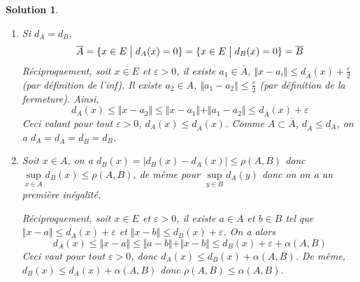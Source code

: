 \documentclass[12pt]{article}
\newtheorem{solution}{Solution}[section]
\theoremstyle{remark}
\begin{document}
\begin{solution}
	\phantom{}
	\begin{enumerate}
		\item Si $d_{A}=d_{B}$, 
		$$\overline{A}=\{x\in E\bigm| d_{A}(x)=0\}=\{x\in E\bigm| d_{B}(x)=0\}=\overline{B}$$
		Réciproquement, soit $x\in E$ et $\varepsilon>0$, il existe $a_{1}\in\overline{A}$, $\Vert x-a_{i}\Vert\leqslant d_{\overline{A}}(x)+\frac{\varepsilon}{2}$ (par définition de l'inf). Il existe $a_{2}\in A$, $\Vert a_{1}-a_{2}\Vert\leqslant\frac{\varepsilon}{2}$ (par définition de la fermeture). Ainsi,
		$$d_{A}(x)\leqslant\Vert x-a_{2}\Vert\leqslant\Vert x-a_{1}\Vert+\Vert a_{1}-a_{2}\Vert\leqslant d_{\overline{A}}(x)+\varepsilon$$
		Ceci valant pour tout $\varepsilon>0$, $d_{A}(x)\leqslant d_{\overline{A}}(x)$. Comme $A\subset\overline{A}$, $d_{\overline{A}}\leqslant d_{A}$, on a $d_{A}=d_{\overline{A}}=d_{\overline{B}}=d_{B}$.

		\item Soit $x\in A$, on a $d_{B}(x)=\vert d_{B}(x)-d_{A}(x)\vert\leqslant\rho(A,B)$ donc $\sup\limits_{x\in A}d_{B}(x)\leqslant\rho(A,B)$, de même pour $\sup\limits_{y\in B}d_{A}(y)$ donc on on a un première inégalité.
		
		Réciproquement, soit $x\in E$ et $\varepsilon>0$, il existe $a\in A$ et $b\in B$ tel que $\Vert x-a\Vert\leqslant d_{A}(x)+\varepsilon$ et $\Vert x-b\Vert\leqslant d_{B}(x)+\varepsilon$.
		On a alors
		$$d_{A}(x)\leqslant\Vert x-a\Vert\leqslant\Vert a-b\Vert+\Vert x-b\Vert\leqslant d_{B}(x)+\varepsilon+\alpha(A,B)$$
		Ceci vaut pour tout $\varepsilon>0$, donc $d_{A}(x)\leqslant d_{B}(x)+\alpha(A,B)$. De même, $d_{B}(x)\leqslant d_{A}(x)+\alpha(A,B)$ donc $\rho(A,B)\leqslant\alpha(A,B)$.
	\end{enumerate}
\end{solution}
\end{document}
